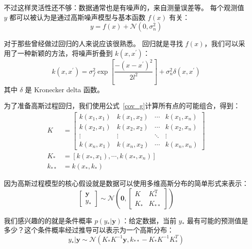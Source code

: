 \documentclass[degree=project, degree-type=project]{thuthesis}
\begin{document}
不过这样灵活性还不够：数据通常也是有噪声的，来自测量误差等。
每个观测值 $y$ 都可以被认为是通过高斯噪声模型与基本函数 $f(x)$ 有关：
\begin{equation}
y = f(x) + \mathcal{N}(0, \sigma_n^2)
\end{equation}

对于那些曾经做过回归的人来说应该很熟悉。
回归就是寻找 $f(x)$，我们可以采用了一种新颖的方法，将噪声折叠到 $k(x, x^\prime)$：
\begin{equation}\label{cov_g}
k(x,x^\prime) = \sigma_f^2 \exp\left[\frac{-(x-x^\prime)^2}{2l^2}\right] + \sigma_n^2 \delta(x,x^\prime)
\end{equation}
其中 $\delta$ 是 Kronecker delta 函数。

为了准备高斯过程回归，我们使用公式~\ref{cov_g}计算所有点的可能组合，得到：
\begin{align}
	K&=\left[\begin{array}{cccc}
	k\left(x_{1}, x_{1}\right) & k\left(x_{1}, x_{2}\right) & \cdots & k\left(x_{1}, x_{n}\right) \\
	k\left(x_{2}, x_{1}\right) & k\left(x_{2}, x_{2}\right) & \cdots & k\left(x_{2}, x_{n}\right) \\
	\vdots & \vdots & \ddots & \vdots \\
	k\left(x_{n}, x_{1}\right) & k\left(x_{n}, x_{2}\right) & \cdots & k\left(x_{n}, x_{n}\right)
	\end{array}\right] \\
	K_{*} &= [k(x_*, x_1), \cdots, k(x_*, x_n)] \\
	k_{**} &= k(x_*, k_*)
\end{align}

因为高斯过程模型的核心假设就是数据可以使用多维高斯分布的简单形式来表示：
\begin{equation}
\left[\begin{array}{c}
\mathbf{y} \\
y_{*}
\end{array}\right] \sim \mathcal{N}\left(\mathbf{0},\left[\begin{array}{cc}
K & K_{*}^{\mathrm{T}} \\
K_{*} & K_{* *}
\end{array}\right]\right)
\end{equation}

我们感兴趣的的就是条件概率 $p(y_* | \boldsymbol{y})$：给定数据，当前 $y_*$ 最有可能的预测值是多少？这个条件概率经过推导可以表示为一个高斯分布：
\begin{equation}
	y_* | \boldsymbol{y} \sim \mathcal{N}(K_* K^{-1}\boldsymbol{y}, k_{**} - K_*K^{-1}K_*^T)
\end{equation}
\end{document}
